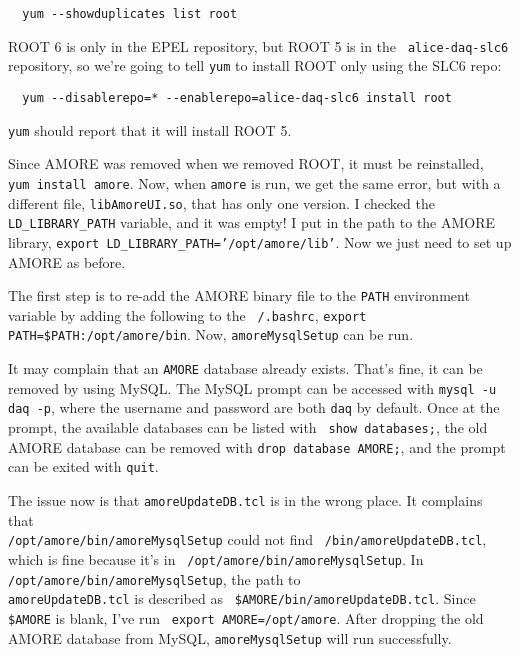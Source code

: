 \documentclass[12pt]{article}
\begin{document}
\begin{verbatim}
  yum --showduplicates list root
\end{verbatim}

 ROOT 6 is only in the EPEL repository, but ROOT 5 is in the {\tt
  alice-daq-slc6} repository, so we're going to tell {\tt yum} to install ROOT
only using the SLC6 repo: 

\begin{verbatim}
  yum --disablerepo=* --enablerepo=alice-daq-slc6 install root
\end{verbatim}

 {\tt yum} should report that it will install ROOT 5.

\qq Since AMORE was removed when we removed ROOT, it must be reinstalled, {\tt
  yum install amore}. Now, when {\tt amore} is run, we get the same error, but
with a different file, {\tt libAmoreUI.so}, that has only one version. I checked
the {\tt LD\_LIBRARY\_PATH} variable, and it was empty! I put in the path to the
AMORE library, {\tt export LD\_LIBRARY\_PATH='/opt/amore/lib'}. Now we just need
to set up AMORE as before.

\qq The first step is to re-add the AMORE binary file to the {\tt PATH}
environment variable by adding the following to the {\tt ~/.bashrc}, {\tt export
  PATH=\$PATH:/opt/amore/bin}. Now, {\tt amoreMysqlSetup} can be run. 

\begin{tcolorbox}[title=NOTE, colback=white, colframe=blue]
  It may complain that an {\tt AMORE} database already exists. That's fine, it
  can be removed by using MySQL. The MySQL prompt can be accessed with {\tt mysql
    -u daq -p}, where the username and password are both {\tt daq} by
  default. Once at the prompt, the available databases can be listed with {\tt
    show databases;}, the old AMORE database can be removed with {\tt drop
    database AMORE;}, and the prompt can be exited with {\tt quit}.
\end{tcolorbox}
  
\qq The issue now is that {\tt amoreUpdateDB.tcl} is in the wrong place. It
complains that \\{\tt /opt/amore/bin/amoreMysqlSetup} could not find {\tt
  /bin/amoreUpdateDB.tcl}, which is fine because it's in {\tt
  /opt/amore/bin/amoreMysqlSetup}. In {\tt /opt/amore/bin/amoreMysqlSetup}, the
path to \\{\tt amoreUpdateDB.tcl} is described as {\tt
  \$AMORE/bin/amoreUpdateDB.tcl}. Since {\tt \$AMORE} is blank, I've run {\tt
  export AMORE=/opt/amore}. After dropping the old AMORE database from MySQL,
{\tt amoreMysqlSetup} will run successfully.
\end{document}
